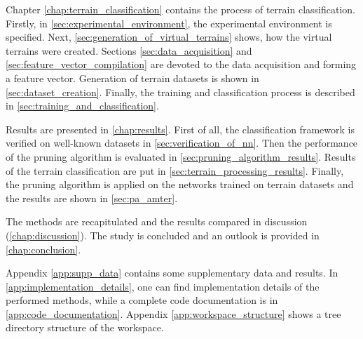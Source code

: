 Chapter \ref{chap:terrain_classification} contains the process of terrain classification. Firstly, in \cref{sec:experimental_environment}, the experimental environment is specified. Next, \cref{sec:generation_of_virtual_terrains} shows, how the virtual terrains were created. Sections \ref{sec:data_acquisition} and \ref{sec:feature_vector_compilation} are devoted to the data acquisition and forming a feature vector. Generation of terrain datasets is shown in \cref{sec:dataset_creation}. Finally, the training and classification process is described in \cref{sec:training_and_classification}.

Results are presented in \cref{chap:results}. First of all, the classification framework is verified on well-known datasets in \cref{sec:verification_of_nn}. Then the performance of the pruning algorithm is evaluated in \cref{sec:pruning_algorithm_results}. Results of the terrain classification are put in \cref{sec:terrain_processing_results}. Finally, the pruning algorithm is applied on the networks trained on terrain datasets and the results are shown in \cref{sec:pa_amter}.

The methods are recapitulated and the results compared in discussion (\cref{chap:discussion}). The study is concluded and an outlook is provided in \cref{chap:conclusion}.

Appendix \ref{app:supp_data} contains some supplementary data and results. In \cref{app:implementation_details}, one can find implementation details of the performed methods, while a complete code documentation is in \cref{app:code_documentation}. Appendix \ref{app:workspace_structure} shows a tree directory structure of the workspace.

